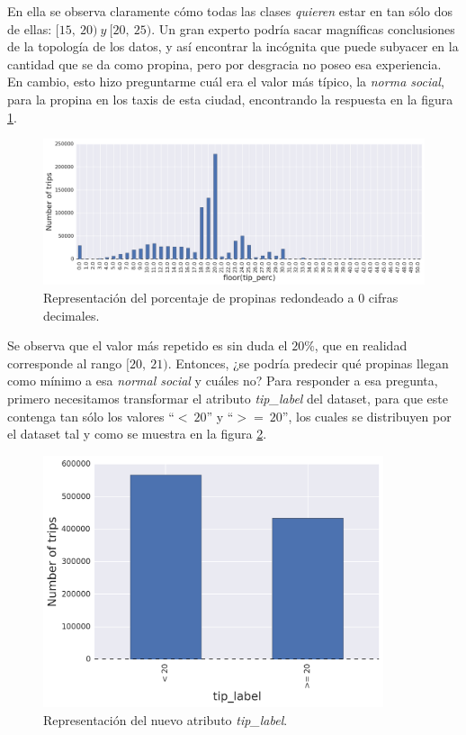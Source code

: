 En ella se observa claramente cómo todas las clases \emph{quieren} estar en tan sólo dos de ellas: $[15,\:20)\:y\:[20,\:25)$. Un gran experto podría sacar magníficas conclusiones de la topología de los datos, y así encontrar la incógnita que puede subyacer en la cantidad que se da como propina, pero por desgracia no poseo esa experiencia. En cambio, esto hizo preguntarme cuál era el valor más típico, la \emph{norma social}, para la propina en los taxis de esta ciudad, encontrando la respuesta en la figura \ref{fig:5.14}.

\begin{figure}[ht]
  \centering
  \includegraphics[width=140mm]{figures/ch_05/tip_perc.png}
  \caption{Representación del porcentaje de propinas redondeado a $0$ cifras decimales.}
  \label{fig:5.14}
\end{figure}

\pagebreak

Se observa que el valor más repetido es sin duda el $20\%$, que en realidad corresponde al rango $[20,\:21)$. Entonces, ¿se podría predecir qué propinas llegan como mínimo a esa \emph{normal social} y cuáles no? Para responder a esa pregunta, primero necesitamos transformar el atributo \emph{tip\_label} del dataset, para que este contenga tan sólo los valores ``$<\:20$'' y ``$>=\:20$'', los cuales se distribuyen por el dataset tal y como se muestra en la figura \ref{fig:5.15}.

\begin{figure}[H]
  \centering
  \includegraphics[width=100mm]{figures/ch_05/tip_label_2.png}
  \caption{Representación del nuevo atributo \emph{tip\_label}.}
  \label{fig:5.15}
\end{figure}

